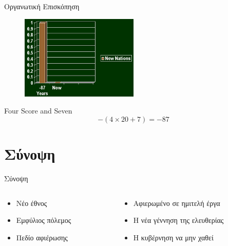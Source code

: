 \documentclass{beamer}
\begin{document}
\begin{frame}{Οργανωτική Επισκόπηση}

\begin{figure}
\includegraphics[width=0.5\textwidth]{gettysburg_graph}
\end{figure}

\begin{block}{\textlatin{Four Score and Seven}}
\begin{equation}
-(4 \times 20 + 7) = -87
\end{equation}
\end{block}

\end{frame}

\section{Σύνοψη}

\begin{frame}{Σύνοψη}

\begin{columns}
\begin{column}{0.4\textwidth}
\begin{itemize}
\item Νέο έθνος
\item Εμφύλιος πόλεμος
\item Πεδίο αφιέρωσης
\end{itemize}
\end{column}
\begin{column}{0.6\textwidth}
\begin{itemize}
\item Αφιερωμένο σε ημιτελή έργα
\item Η νέα γέννηση της ελευθερίας
\item Η κυβέρνηση να μην χαθεί
\end{itemize}
\end{column}
\end{columns}

\end{frame}
\end{document}
